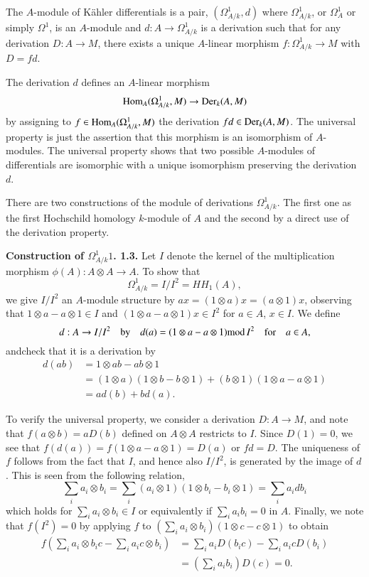 \begin{definition}\label{chap6-defi1.2}
The $A$-module of K\"ahler differentials is a pair,
$(\Omega^{1}_{A/k},d)$ where $\Omega^{1}_{A/k}$, or $\Omega^{1}_{A}$
or simply $\Omega^{1}$, is an $A$-module and $d:A\to \Omega^{1}_{A/k}$
is a derivation such that for any derivation $D:A\to M$, there exists
a unique $A$-linear morphism $f:\Omega^{1}_{A/k}\to M$ with $D=fd$.
\end{definition}

The derivation $d$ defines an $A$-linear morphism
$$
\operatorname{Hom}_{A}(\Omega^{1}_{A/k},M)\to \operatorname{Der}_{k}(A,M)
$$
by assigning to $f\in \operatorname{Hom}_{A}(\Omega^{1}_{A/k},M)$ the derivation
$fd\in \operatorname{Der}_{k}(A,M)$. The universal property is just the assertion
that this morphism is an isomorphism of $A$-modules. The universal
property shows that two possible $A$-modules of differentials are
isomorphic with a unique isomorphism preserving the derivation $d$.

There are two constructions of the module of derivations
$\Omega^{1}_{A/k}$. The first one as the first Hochschild homology
$k$-module of $A$ and the second by a direct use of the derivation
property.

\medskip
\noindent
{\bf Construction of {\boldmath$\Omega^{1}_{A/k}1$}. 1.3.} Let $I$
denote the kernel of the multiplication morphism $\phi(A):A\otimes
A\to A$. To show that
$$
\Omega^{1}_{A/k}=I/I^{2}=HH_{1}(A),
$$
we give $I/I^{2}$ an $A$-module structure by $ax=(1\otimes
a)x=(a\otimes 1)x$, observing that $1\otimes a-a\otimes 1\in I$ and
$(1\otimes a-a\otimes 1)x\in I^{2}$ for $a\in A$, $x\in I$. We define 
$$
d:A\to I/I^{2}\quad\text{by}\quad d(a)=(1\otimes a-a\otimes
1)\text{mod}\,I^{2}\quad\text{for}\quad a\in A,
$$
and\pageoriginale check that it is a derivation by
\begin{align*}
d(ab) &= 1\otimes ab-ab\otimes 1\\
&=(1\otimes a)(1\otimes b-b\otimes
1)+(b\otimes 1)(1\otimes a-a\otimes 1)\\
&= ad(b)+bd(a).
\end{align*}

To verify the universal property, we consider a derivation $D:A\to M$,
and note that $f(a\otimes b)=aD(b)$ defined on $A\otimes A$ restricts
to $I$. Since $D(1)=0$, we see that $f(d(a))=f(1\otimes a-a\otimes
1)=D(a)$ or $fd=D$. The uniqueness of $f$ follows from the fact that
$I$, and hence also $I/I^{2}$, is generated by the image of $d$. This
is seen from the following relation,
$$
\sum_{i}a_{i}\otimes b_{i}=\sum_{i}(a_{i}\otimes 1)(1\otimes
b_{i}-b_{i}\otimes 1)=\sum_{i}a_{i}db_{i}
$$
which holds for $\displaystyle{\sum_{i}} a_{i}\otimes b_{i}\in I$ or
equivalently if 
$\displaystyle{\sum_{i}} a_{i}b_{i}=0$ in $A$. Finally, we note that
$f(I^{2})=0$ by 
applying $f$ to $(\displaystyle{\sum_{i}}a_{i}\otimes b_{i})(1\otimes
  c-c\otimes 1)$ 
to obtain 
\begin{align*}
  f\left(\sum_{i}a_{i}\otimes b_{i}c-\sum_{i}a_{i}c\otimes
  b_{i}\right)& =\sum_{i}a_{i}D(b_{i}c)-\sum_{i}a_{i}cD(b_{i})\\
  & =\left(\sum_{i}a_{i}b_{i}\right)D(c)=0.  
\end{align*}

